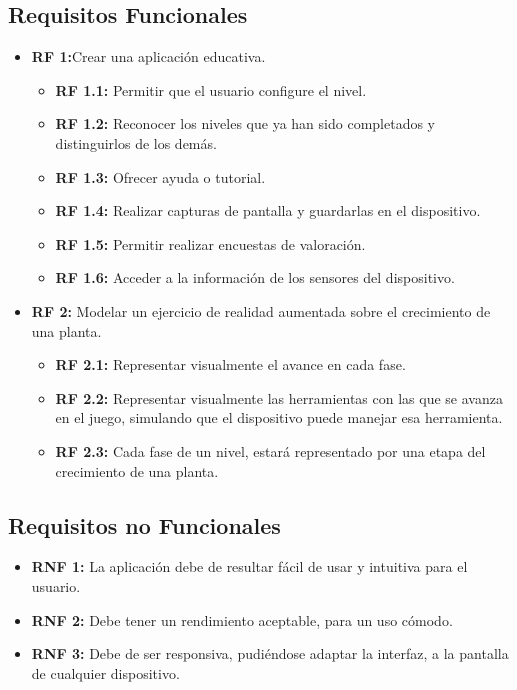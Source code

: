 \subsection{Requisitos Funcionales}
 \begin{itemize}
	\item \textbf{RF 1:}Crear una aplicación educativa.
	\begin{itemize}
	\item \textbf{RF 1.1:} Permitir que el usuario configure el nivel.
	\item \textbf{RF 1.2:} Reconocer los niveles que ya han sido completados y distinguirlos de los demás.
	\item \textbf{RF 1.3:} Ofrecer ayuda o tutorial.	
	\item \textbf{RF 1.4:} Realizar capturas de pantalla y guardarlas en el dispositivo.
	\item \textbf{RF 1.5:} Permitir realizar encuestas de valoración.
	\item \textbf{RF 1.6:} Acceder a la información de los sensores del dispositivo.
	
	\end{itemize} 
	\item \textbf{RF 2:} Modelar un ejercicio de realidad aumentada sobre el crecimiento de una planta.
	\begin{itemize}
	\item \textbf{RF 2.1:} Representar visualmente el avance en cada fase.
	\item \textbf{RF 2.2:} Representar visualmente las herramientas con las que se avanza en el juego, simulando que el dispositivo puede manejar esa herramienta.
	\item \textbf{RF 2.3:} Cada fase de un nivel, estará representado por una etapa del crecimiento de una planta.
	
	\end{itemize} 
	
	
\end{itemize}
\subsection{Requisitos no Funcionales}
\begin{itemize}
	\item \textbf{RNF 1:} La aplicación debe de resultar fácil de usar y intuitiva para el usuario.
	\item \textbf{RNF 2:} Debe tener un rendimiento aceptable, para un uso cómodo.
	\item \textbf{RNF 3:} Debe de ser responsiva, pudiéndose adaptar la interfaz, a la pantalla de cualquier dispositivo.
\end{itemize}
